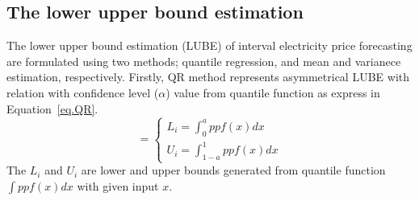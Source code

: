 \documentclass[review]{elsarticle}
\begin{document}
    \subsection{The lower upper bound estimation}
      The lower upper bound estimation (LUBE) of interval electricity price forecasting are formulated using two methods; quantile regression, and mean and varianece estimation, respectively.
      Firstly, QR method represents asymmetrical LUBE with relation with confidence level ($\alpha$) value from quantile function as express in Equation~\ref{eq.QR}.
      \begin{equation}
        [L_{i}, U_{i}]=
        \begin{cases}
        L_{i}=\int_{0}^{a} ppf(x) dx\\
        U_{i}=\int_{1-a}^{1} ppf(x) dx
        \end{cases}
        \label{eq.QR}
      \end{equation}
      The $L_{i}$ and $U_{i}$ are lower and upper bounds generated from quantile function $\int ppf(x) dx$ with given input $x$.
\end{document}
